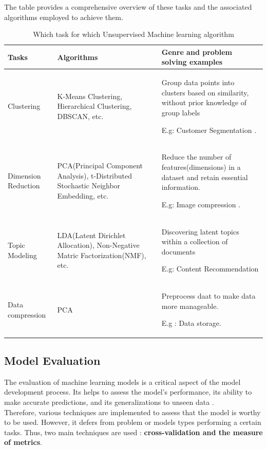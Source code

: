 \documentclass[12pt,a4paper, oneside]{book}
\begin{document}
The table provides a comprehensive overview of these tasks and the associated algorithms employed to achieve them.

\renewcommand{\arraystretch}{1.2}
\begin{table}[h]
	\begin{tabular}{p{3cm}p{5.6cm}p{6cm}} 
		
		\toprule 
		Tasks & Algorithms & Genre and problem solving examples    \\
		\toprule
		Clustering & K-Means Clustering, Hierarchical Clustering, DBSCAN, etc. & Group data points into clusters based on similarity, without prior knowledge of group labels
		
		E.g: Customer Segmentation . \\
		
		Dimension Reduction & PCA(Principal Component Analysis), t-Distributed Stochastic Neighbor Embedding, etc. & Reduce the number of features(dimensions) in a dataset and retain essential information.
		
		E.g: Image compression .\\
		Topic Modeling & LDA(Latent Dirichlet Allocation), Non-Negative Matric Factorization(NMF), etc. & Discovering latent topics within a collection of documents
		
		E.g: Content Recommendation \\
		
		Data compression & PCA & Preprocess daat to make data more manageable.
		
		E.g : Data storage.\\
						
		\bottomrule
	\end{tabular} 
	\caption{Which task for which Unsupervised Machine learning algorithm} 
	\label{whichTaskWhichModelUnsupervised} 
\end{table}  


\subsection{Model Evaluation}
The evaluation of machine learning models is a critical aspect of the model development process. Its helps to assess the model's performance, its ability to make accurate predictions, and its generalizations to unseen data \cite{raschka2018model}. \\

Therefore, various techniques are implemented to assess that the model is worthy to be used. However, it defers from problem or models types performing a certain tasks. Thus, two main techniques are used : \textbf{cross-validation and the measure of metrics}.\\
\end{document}
